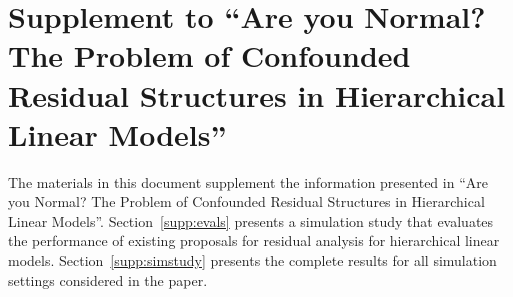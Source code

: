 \documentclass[12pt]{article} %
\newcommand{\trans}{\ensuremath{^\prime}}
\newcommand{\var}{\ensuremath{\mathrm{Var}}}
\begin{document}
%
%
%
%





\clearpage

\appendix
\section{Supplement to ``Are you Normal? The Problem of Confounded Residual Structures in Hierarchical Linear Models''}

The materials in this document supplement the information presented in ``Are you Normal? The Problem of Confounded Residual Structures in Hierarchical Linear Models''. Section~\ref{supp:evals} presents a simulation study that evaluates the performance of existing proposals for residual analysis for hierarchical linear models. Section~\ref{supp:simstudy} presents the complete results for all simulation settings considered in the paper. 
\end{document}
